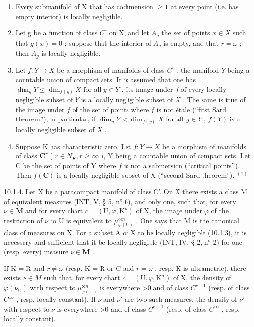 \begin{enumerate}
\def\labelenumi{\alph{enumi})}
\item
  Every submanifold of X that has codimension \(\geqslant1\) at every point (i.e. has empty interior) is locally negligible.
\item
  Let g be a function of class \(C^{r}\) on X, and let \(A_{g}\) the set of points \(x \in X\) such that \(g(x) = 0\) ; suppose that the interior of \(A_{g}\) is empty, and that \(r = \omega\) ; then \(A_{g}\) is locally negligible.
\item
  Let \(f: Y \to X\) be a morphism of manifolds of class \(C^{r}\) , the manifold \(Y\) being a countable union of compact sets. It is assumed that one has \(\dim_{y} Y \leqslant \dim_{f(y)} X\) for all \(y \in Y\) . Its image under \(f\) of every locally negligible subset of \(Y\) is a locally negligible subset of \(X\) . The same is true of the image under \(f\) of the set of points where \(f\) is not étale (“first Sard theorem”); in particular, if \(\dim_{y} Y < \dim_{f(y)} X\) for all \(y \in Y\) , \(f(Y)\) is a locally negligible subset of \(X\) .
\item
  Suppose K has characteristic zero. Let \(f\colon Y\to X\) be a morphism of manifolds of class \(\mathbf{C}^{r}\) ( \(r\in N_{K}, r\geqslant\infty\) ), Y being a countable union of compact sets. Let C be the set of points of Y where \(f\) is not a submersion (“critical points”). Then \(f(\mathbf{C})\) is a locally negligible subset of X (“second Sard theorem”). \(^{(1)}\)
\end{enumerate}

10.1.4. Let X be a paracompact manifold of class C'. On X there exists a class M of equivalent measures (INT, V, § 5, n° 6), and only one, such that, for every \(\nu \in \mathbf{M}\) and for every chart \(c = (\mathrm{U}, \varphi, \mathrm{K}^n)\) of X, the image under \(\varphi\) of the restriction of \(\nu\) to U is equivalent to \(\mu_{\varphi(\mathrm{U})}^{\otimes n}\) . One says that M is the canonical class of measures on X. For a subset A of X to be locally negligible (10.1.3), it is necessary and sufficient that it be locally negligible (INT, IV, § 2, n° 2) for one (resp. every) measure \(\nu \in \mathbf{M}\) .

If K = R and \(r \neq \omega\) (resp. K = R or C and \(r = \omega\) , resp. K is ultrametric), there exists \(\nu \in M\) such that, for every chart \(c = (\mathrm{U}, \varphi, \mathrm{K}^{n})\) of X, the density of \(\varphi(\nu_{\mathrm{U}})\) with respect to \(\mu_{\varphi(\mathrm{U})}^{\otimes n}\) is everywhere \textgreater0 and of class \(C^{r-1}\) (resp. of class \(C^{\infty}\) , resp. locally constant). If \(\nu\) and \(\nu'\) are two such measures, the density of \(\nu'\) with respect to \(\nu\) is everywhere \textgreater0 and of class \(C^{r-1}\) (resp. of class \(C^{\infty}\) , resp. locally constant).

